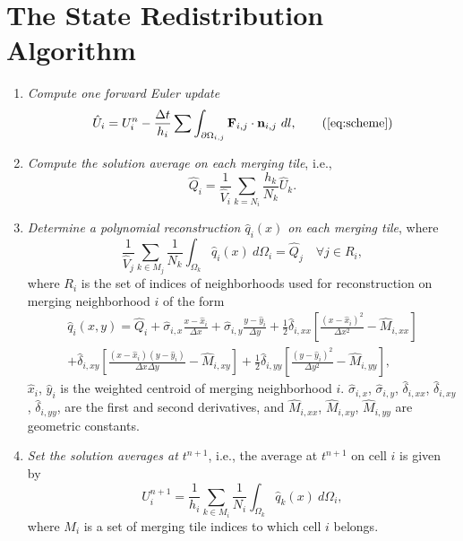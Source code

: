 \section{The State Redistribution Algorithm}\label{srdAlg}
\begin{enumerate}[label=Step \arabic*:]
    \item \textit{Compute one forward Euler update}
    \begin{equation} 
    \hat{U}_i = U^n_i - \frac{\Delta t}{h_i}\sum \int_{\partial \Omega_{i,j}} \mathbf{F}_{i,j} \cdot \mathbf{n}_{i,j}~dl,\tag{\ref{eq:scheme}}
    \end{equation}
	\item \textit{Compute the solution average on each merging tile}, i.e.,
	\begin{equation}\label{eq:q_avg1}
	    \hat Q_i =  \frac{1}{\hat V_i}\sum_{k = N_i}\frac{h_k}{N_k} \hat U_k.
	\end{equation}
\item \textit{Determine a polynomial reconstruction $\hat q_i(x)$ on each merging tile}, where
\begin{equation}\label{eq:qi}
\frac{1}{\hat V_j}\sum_{k \in M_j}\frac{1}{N_k}\int_{\Omega_k} \hat q_i(x)~d\Omega_i = \hat Q_j \quad \forall j \in R_i,
\end{equation}
where $R_i$ is the set of indices of neighborhoods used for reconstruction on merging neighborhood $i$ of the form
\begin{equation}\label{eq:q}
\begin{aligned}
	    \hat q_i(x,y) = \hat Q_{i} + \hat \sigma_{i,x}\frac{x-\hat x_i}{\Delta x} +  \hat \sigma_{i,y}\frac{y-\hat y_i}{\Delta y} + \frac{1}{2}\hat \delta_{i, xx}\left[ \frac{(x - \hat x_i)^2 }{\Delta x^2} - \hat M_{i,xx}\right]\\
	    +\hat \delta_{i, xy}\left[ \frac{(x - \hat x_i) (y - \hat y_i) }{\Delta x \Delta y} - \hat M_{i,xy}\right] + \frac{1}{2}\hat \delta_{i, yy}\left[ \frac{(y - \hat y_i)^2 }{\Delta y^2} -  \hat M_{i,yy}\right],
\end{aligned}
\end{equation}
$\hat x_i$, $\hat y_i$ is the weighted centroid of merging neighborhood $i$. $\hat \sigma_{i,x}$, $\hat \sigma_{i,y}$, $\hat \delta_{i,xx}$, $\hat \delta_{i,xy}$, $\hat \delta_{i,yy}$, are the first and second derivatives, and $ \hat M_{i,xx}$, $\hat M_{i,xy}$,  $\hat M_{i,yy}$ are geometric constants. 

\item \textit{Set the solution averages at $t^{n+1}$}, i.e., the average at $t^{n+1}$ on cell $i$ is given by
	\begin{equation}\label{eq:final_update}
	U^{n+1}_i =  \frac{1}{h_i}\sum_{k \in M_{i}}\frac{1}{N_i}\int_{\Omega_k} \hat q_k(x)~d\Omega_i,
	\end{equation}
	where $M_i$ is a set of merging tile indices to which cell $i$ belongs.
\end{enumerate}

	